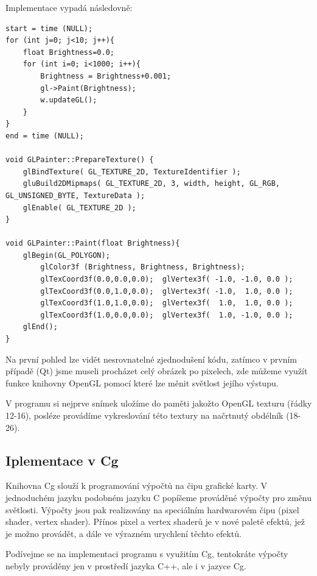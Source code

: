 Implementace vypadá následovně:

\begin{lstlisting}[label=DicomImageClass,caption={...}]
start = time (NULL);
for (int j=0; j<10; j++){
	float Brightness=0.0;
	for (int i=0; i<1000; i++){
		Brightness = Brightness+0.001;
		gl->Paint(Brightness);
		w.updateGL();
	}
}
end = time (NULL);

void GLPainter::PrepareTexture() {
	glBindTexture( GL_TEXTURE_2D, TextureIdentifier );
	gluBuild2DMipmaps( GL_TEXTURE_2D, 3, width, height, GL_RGB, GL_UNSIGNED_BYTE, TextureData );
	glEnable( GL_TEXTURE_2D );
}

void GLPainter::Paint(float Brightness){
	glBegin(GL_POLYGON);
		glColor3f (Brightness, Brightness, Brightness);
		glTexCoord3f(0.0,0.0,0.0);	glVertex3f( -1.0, -1.0, 0.0 );
		glTexCoord3f(0.0,1.0,0.0);	glVertex3f( -1.0,  1.0, 0.0 );
		glTexCoord3f(1.0,1.0,0.0);	glVertex3f(  1.0,  1.0, 0.0 );
		glTexCoord3f(1.0,0.0,0.0);	glVertex3f(  1.0, -1.0, 0.0 );
	glEnd();
}
\end{lstlisting}
Na první pohled lze vidět nesrovnatelné zjednodušení kódu, zatímco v prvním případě (Qt) jsme museli procházet celý obrázek po pixelech, zde můžeme využít funkce knihovny OpenGL pomocí které lze měnit světlost jejího výstupu.

V programu si nejprve snímek uložíme do paměti jakožto OpenGL texturu (řádky 12-16), posléze provádíme vykreslování této textury na načrtnutý obdélník (18-26).


\subsection{Iplementace v Cg}

Knihovna Cg slouží k programování výpočtů na čipu grafické karty. V jednoduchém jazyku podobném jazyku C popíšeme prováděné výpočty pro změnu světlosti. Výpočty jsou pak realizovány na speciálním hardwarovém čipu (pixel shader, vertex shader). Přínos pixel a vertex shaderů je v nové paletě efektů, jež je možno provádět, a dále ve výrazném urychlení těchto efektů.

Podívejme se na implementaci programu s využitím Cg, tentokráte výpočty nebyly prováděny jen v prostředí jazyka C++, ale i v jazyce Cg.

